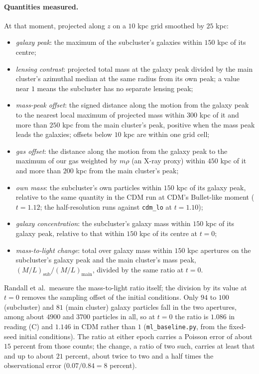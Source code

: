 \documentclass[11pt]{article}
\theoremstyle{definition}
\newcommand{\file}[1]{\texttt{#1}}
\begin{document}
\paragraph{Quantities measured.} At that moment, projected along $z$ on a $10$ kpc grid smoothed by $25$ kpc:
\begin{itemize}
\item \emph{galaxy peak}: the maximum of the subcluster's galaxies within $150$ kpc of its centre;
\item \emph{lensing contrast}: projected total mass at the galaxy peak divided by the main cluster's azimuthal median at the same radius from its own peak; a value near $1$ means the subcluster has no separate lensing peak;
\item \emph{mass-peak offset}: the signed distance along the motion from the galaxy peak to the nearest local maximum of projected mass within $300$ kpc of it and more than $250$ kpc from the main cluster's peak, positive when the mass peak leads the galaxies; offsets below $10$ kpc are within one grid cell;
\item \emph{gas offset}: the distance along the motion from the galaxy peak to the maximum of our gas weighted by $m\rho$ (an X-ray proxy) within $450$ kpc of it and more than $200$ kpc from the main cluster's peak;
\item \emph{own mass}: the subcluster's own particles within $150$ kpc of its galaxy peak, relative to the same quantity in the CDM run at CDM's Bullet-like moment ($t = 1.12$; the half-resolution runs against \texttt{cdm\_lo} at $t = 1.10$);
\item \emph{galaxy concentration}: the subcluster's galaxy mass within $150$ kpc of its galaxy peak, relative to that within $150$ kpc of its centre at $t = 0$;
\item \emph{mass-to-light change}: total over galaxy mass within $150$ kpc apertures on the subcluster's galaxy peak and the main cluster's mass peak, $(M/L)_{\mathrm{sub}}/(M/L)_{\mathrm{main}}$, divided by the same ratio at $t = 0$.
\end{itemize}
Randall et al.\ measure the mass-to-light ratio itself; the division by its value at $t = 0$ removes the sampling offset of the initial conditions. Only $94$ to $100$ (subcluster) and $81$ (main cluster) galaxy particles fall in the two apertures, among about $4900$ and $3700$ particles in all, so at $t = 0$ the ratio is $1.086$ in reading (C) and $1.146$ in CDM rather than $1$ (\file{ml\_baseline.py}, from the fixed-seed initial conditions). The ratio at either epoch carries a Poisson error of about $15$ percent from those counts; the change, a ratio of two such, carries at least that and up to about $21$ percent, about twice to two and a half times the observational error ($0.07/0.84 = 8$ percent).
\end{document}

